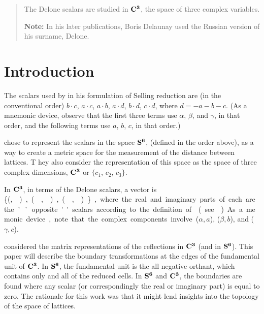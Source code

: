 \documentclass[]{iucr}              %
\numberwithin{equation}{section}
\newcommand{\SVI}[0]{$\bf{S^{6}}$}
\newcommand{\CIII}[0]{$\bf{C^{3}}$}
\begin{document}
	\newcommand{\ci}[0]{$c_1$}
	\newcommand{\cii}[0]{$c_2$}
	\newcommand{\ciii}[0]{$c_3$}
	
	
	\begin{abstract}
		
		The Delone scalars are studied in \CIII, the space of three complex variables.
		
		{\bf Note:}  In his later publications, Boris Delaunay used the Russian version of his surname, Delone.\\
		
		
	\end{abstract}
	
	
	\section{Introduction}
	
	The scalars used by  in his formulation of Selling reduction \cite{Selling1874}
	are (in the conventional order) $b \cdot c$, $a \cdot c$, $a \cdot b$, $a \cdot d$, 
	$b \cdot d$, $c \cdot d$, where $d = -a-b-c$. 
	(As a mnemonic device, 
	observe that the first three terms use
	$\alpha$, $\beta$, and $\gamma$, 
	in that order, 
	and the following terms use $a$, $b$, $c$, in that order.)
	
	 chose to 
	represent the scalars in the space \SVI{},
	\Svec{} (defined in the order above), 
	as a way to create a metric space
	for the measurement of the distance between lattices. T
	hey also consider the representation of this space as the
	space of three complex dimensions, \CIII{} or 
	{$\{c_1$}, {$c_2$}, {$c_3\}$}. 	
	
	In \CIII{}, in terms of the Delone scalars, 
	a vector is \{(\si,\siv ), (\sii,\sv),(\siii,\svi)\}, 
	where the real and imaginary parts
	of each are the ``opposite'' scalars 
	according to the definition of  (see ).
	As a memonic device, 
	note that the complex components involve ($\alpha,a$), ($\beta, b$), and ($\gamma,c$).
	
		 considered the matrix representations of the reflections in \CIII{} (and in \SVI{}). 
		This paper will describe the boundary transformations 
		at the edges of the fundamental	unit of \CIII{}. 
		In \SVI{}, the fundamental unit is the all negative orthant, 
		which contains only and	all of the reduced cells. 
		In \SVI{} and \CIII{}, 
		the boundaries are found where any scalar 
		(or correspondingly the real or imaginary part) 
		is equal to zero. The rationale for this work was 
		that it might lend insights into the topology of
		 the space of lattices. 
	
\end{document}
